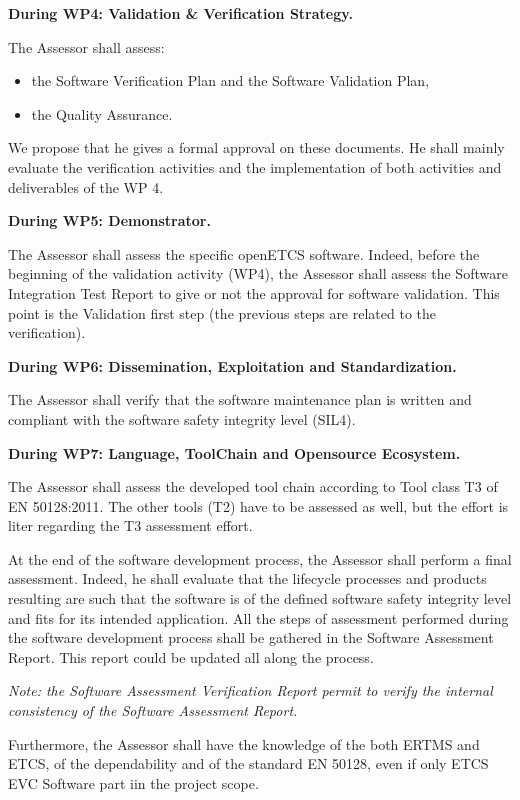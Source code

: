 \documentclass{template/openetcs_report}
\begin{document}
\textbf{
During WP4: Validation \& Verification Strategy.
}

The Assessor shall assess:
\begin{itemize}\itemsep=0pt
  \item the Software Verification Plan and the Software Validation Plan,
  \item the Quality Assurance.
 \end{itemize}
We propose that he gives a formal approval on these documents. 
He shall mainly evaluate the verification activities and the implementation of both activities and deliverables of the WP 4.


\textbf{
During WP5: Demonstrator.
}

The Assessor shall assess the specific openETCS software.
Indeed, before the beginning of the validation activity (WP4), the Assessor shall assess the Software Integration Test Report to give or not the approval for software validation. This point is the Validation first step (the previous steps are related to the verification).


\textbf{
During WP6: Dissemination, Exploitation and Standardization.
}

The Assessor shall verify that the software maintenance plan is written and compliant with the software safety integrity level (SIL4).

\textbf{
During WP7: Language, ToolChain and Opensource Ecosystem.
}

The Assessor shall assess the developed tool chain according to Tool class T3 of EN 50128:2011. The other tools (T2) have to be assessed as well, but the effort is liter regarding the T3 assessment effort.

At the end of the software development process, the Assessor shall perform a final assessment. Indeed, he shall evaluate that the lifecycle processes and products resulting are such that the software is of the defined software safety integrity level and fits for its intended application. All the steps of assessment performed during the software development process shall be gathered in the Software Assessment Report. This report could be updated all along the process.

{\itshape
Note: the Software Assessment Verification Report permit to verify the internal consistency of the Software Assessment Report.
}

Furthermore, the Assessor shall have the knowledge of the both ERTMS and ETCS, of the dependability and of the standard EN 50128, even if only ETCS EVC Software part iin the project scope.
\end{document}

